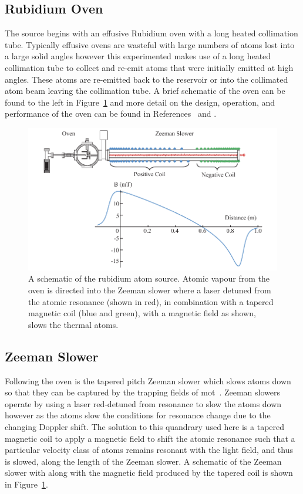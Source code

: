\subsection{Rubidium Oven}
The source begins with an effusive Rubidium oven with a long heated collimation tube.
Typically effusive ovens are wasteful with large numbers of atoms lost into a large solid angles however this experimented makes use of a long heated collimation tube to collect and re-emit atoms that were initially emitted at high angles.
These atoms are re-emitted back to the reservoir or into the collimated atom beam leaving the collimation tube.
A brief schematic of the oven can be found to the left in Figure~\ref{figure:zeemanoven} and more detail on the design, operation, and performance of the oven can be found in References~\cite{bell_slow_2010} and \cite{bell_cold_2011}.

\begin{figure}
    \center
    \includegraphics[width=145mm]{part2/Figs/ZeemanOven.pdf}
    \caption{A schematic of the rubidium atom source. Atomic vapour from the oven is directed into the Zeeman slower where a laser detuned from the atomic resonance (shown in red), in combination with a tapered magnetic coil (blue and green), with a magnetic field as shown, slows the thermal atoms.}
    \label{figure:zeemanoven}
\end{figure}

\subsection{Zeeman Slower}
Following the oven is the tapered pitch Zeeman slower which slows atoms down so that they can be captured by the trapping fields of \gls{mot}~\cite{bell_slow_2010}.
Zeeman slowers operate by using a laser red-detuned from resonance to slow the atoms down however as the atoms slow the conditions for resonance change due to the changing Doppler shift.
The solution to this quandrary used here is a tapered magnetic coil to apply a magnetic field to shift the atomic resonance such that a particular velocity class of atoms remains resonant with the light field, and thus is slowed, along the length of the Zeeman slower.
A schematic of the Zeeman slower with along with the magnetic field produced by the tapered coil is shown in Figure~\ref{figure:zeemanoven}.

